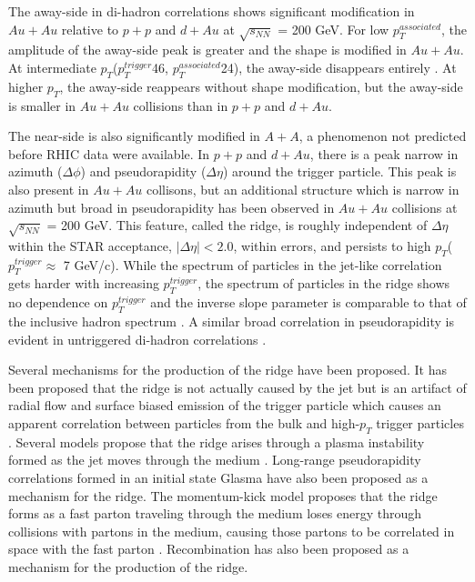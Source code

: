 \documentclass[aps,prc,twocolumn,groupedaddress,showpacs,preprintnumbers,amsmath,amssymb]{revtex4}
\newcommand{\sNNtwohundred}{$\sqrt{s_{NN}}$ = 200 GeV\xspace}
\newcommand{\pttrig}{$p_T^{trigger}$\xspace}
\newcommand{\ptassoc}{$p_T^{associated}$\xspace}
\newcommand{\pT}{$p_T$\xspace}
\newcommand{\ridge}{ridge\xspace}
\newcommand{\pp}{$p+p$\xspace}
\newcommand{\Au}{$Au+Au$\xspace}
\newcommand{\dAu}{$d+Au$\xspace}
\newcommand{\AplusA}{$A+A$\xspace}
\newcommand{\GeV}{GeV/c\xspace}
\newcommand{\dphi}{$\Delta\phi$\xspace}
\newcommand{\deta}{$\Delta\eta$\xspace}
\newcommand{\as}{away-side\xspace}
\newcommand{\ns}{near-side\xspace}
\newcommand{\roughly}{$\approx$\xspace}
\begin{document}
The \as in di-hadron correlations shows significant modification in \Au relative to \pp and \dAu at \sNNtwohundred.  For low \ptassoc, the amplitude of the \as peak is greater and the shape is modified in \Au \cite{starZYAM,STARConical:2008nd}.  At intermediate \pT (\pttrig{4}{6}, \ptassoc{2}{4}), the \as disappears entirely \cite{DisappearanceAwaySide}.  At higher \pT, the \as reappears without shape modification, but the \as is smaller in \Au collisions than in \pp and \dAu \cite{PunchThrough}.

The \ns is also significantly modified in \AplusA, a phenomenon not predicted before RHIC data were available.  In \pp and \dAu, there is a peak narrow in azimuth (\dphi) and pseudorapidity (\deta) around the trigger particle.  This peak is also present in \Au collisons, but an additional structure which is narrow in azimuth but broad in pseudorapidity has been observed in \Au collisions at \sNNtwohundred.  This feature, called the \ridge, is roughly independent of \deta within the STAR acceptance, $|\Delta\eta|<2.0$, within errors, and persists to high \pT (\pttrig \roughly 7 \GeV).  While the spectrum of particles in the jet-like correlation gets harder with increasing \pttrig, the spectrum of particles in the \ridge shows no dependence on \pttrig and the inverse slope parameter is comparable to that of the inclusive hadron spectrum \cite{RidgePaper}.  A similar broad correlation in pseudorapidity is evident in untriggered di-hadron correlations \cite{MiniJets}.

Several mechanisms for the production of the \ridge have been proposed.  It has been proposed that the \ridge is not actually caused by the jet but is an artifact of radial flow and surface biased emission of the trigger particle which causes an apparent correlation between particles from the bulk and high-\pT trigger particles \cite{Sergei,Pruneau:2007ua}.  Several models propose that the \ridge arises through a plasma instability formed as the jet moves through the medium \cite{Majumder:2006wi}.  Long-range pseudorapidity correlations formed in an initial state Glasma have also been proposed as a mechanism for the \ridge \cite{Dumitru:2008wn,Glasma2}.  The momentum-kick model proposes that the \ridge forms as a fast parton traveling through the medium loses energy through collisions with partons in the medium, causing those partons to be correlated in space with the fast parton \cite{Wong:2008yh,Wong:2007mf,Wong:2007pz}.  Recombination has also been proposed as a mechanism for the production of the \ridge \cite{Hwa:2008jt,Hwa:2008um,Chiu:2008ht}.
\end{document}
